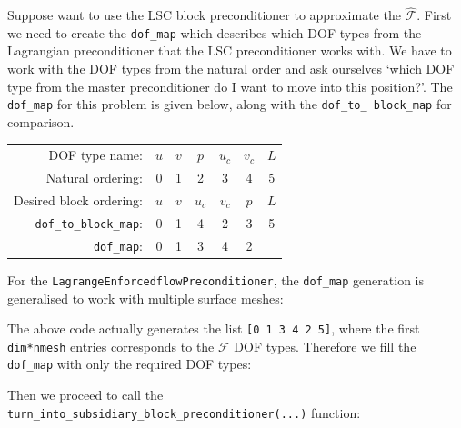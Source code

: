 Suppose want to use the LSC block preconditioner to approximate the
$\hat{\mathcal{F}}$. First we need to create the \texttt{dof\_\allowbreak map}
which describes which DOF types from the Lagrangian preconditioner that the LSC
preconditioner works with. We have to work with the DOF types from the natural
order and ask ourselves `which DOF type from the master preconditioner do I
want to move into this position?'. The \texttt{dof\_\allowbreak map} for this
problem is given below, along with the \texttt{dof\_\allowbreak to\_\allowbreak
  block\_\allowbreak map} for comparison.
\begin{center}
    \begin{tabular}{ | r | c c c c c c |}
    \hline
    DOF type name:      & $u$ & $v$ & $p$ & $u_c$  & $v_c$ & $L$ \\ 
    Natural ordering:   & 0   &  1  &  2  &   3    &   4   &  5  \\ 
Desired block ordering: & $u$ & $v$ & $u_c$ & $v_c$& $p$   & $L$ \\ 
\texttt{dof\_to\_block\_map}:& 0   &  1  &  4  &   2    &   3   &  5  \\
\texttt{dof\_map}:         & 0   &  1  &  3  &   4    &   2   &     \\
    \hline
    \end{tabular}
\end{center}
For the \texttt{Lagrange\allowbreak Enforcedflow\allowbreak Preconditioner},
the \texttt{dof\_\allowbreak map} generation is generalised to work with
multiple surface meshes:

The above code actually generates the list \texttt{[0 1 3 4 2 5]}, where the first \texttt{dim*nmesh} entries corresponds to the $\mathcal{F}$ DOF types. Therefore we fill the \texttt{dof\_\allowbreak map} with only the required DOF types:

Then we proceed to call the \texttt{turn\_\allowbreak into\_\allowbreak subsidiary\_\allowbreak block\_\allowbreak preconditioner(...)} function:


